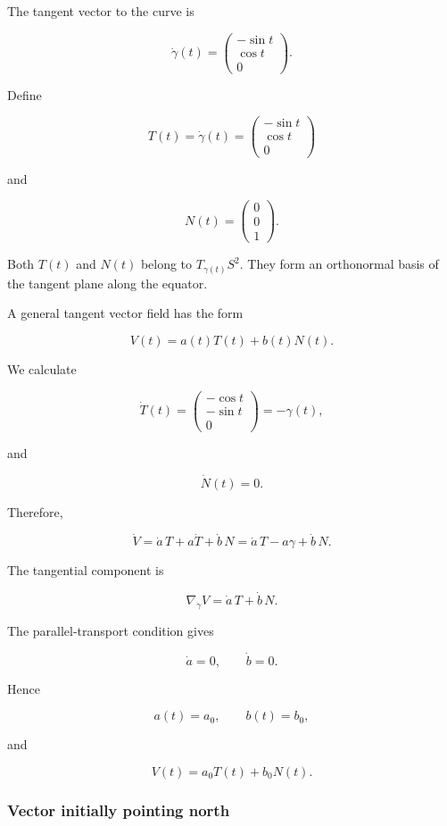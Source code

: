 \documentclass[12pt,a4paper]{article}
\theoremstyle{notespace}
\begin{document}
The tangent vector to the curve is

\[
\dot\gamma(t)
=
\begin{pmatrix}
	-\sin t\\
	\cos t\\
	0
\end{pmatrix}.
\]

Define

\[
T(t)
=
\dot\gamma(t)
=
\begin{pmatrix}
	-\sin t\\
	\cos t\\
	0
\end{pmatrix}
\]

and

\[
N(t)
=
\begin{pmatrix}
	0\\
	0\\
	1
\end{pmatrix}.
\]

Both \(T(t)\) and \(N(t)\) belong to \(T_{\gamma(t)}S^2\). They form an
orthonormal basis of the tangent plane along the equator.

A general tangent vector field has the form

\[
V(t)=a(t)T(t)+b(t)N(t).
\]

We calculate

\[
\dot T(t)
=
\begin{pmatrix}
	-\cos t\\
	-\sin t\\
	0
\end{pmatrix}
=
-\gamma(t),
\]

and

\[
\dot N(t)=0.
\]

Therefore,

\[
\dot V
=
\dot a\,T
+
a\dot T
+
\dot b\,N
=
\dot a\,T
-
a\gamma
+
\dot b\,N.
\]

The tangential component is

\[
\nabla_{\dot\gamma}V
=
\dot a\,T+\dot b\,N.
\]

The parallel-transport condition gives

\[
\dot a=0,
\qquad
\dot b=0.
\]

Hence

\[
a(t)=a_0,
\qquad
b(t)=b_0,
\]

and

\[
\boxed{
	V(t)=a_0T(t)+b_0N(t).
}
\]

\subsubsection{Vector initially pointing north}
\end{document}
